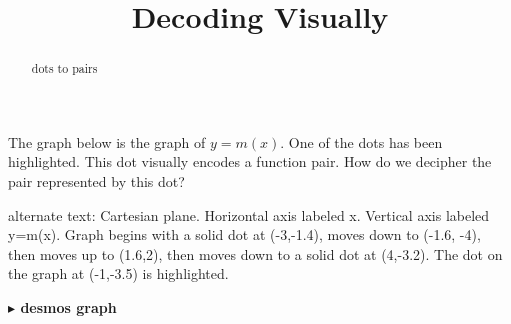 \documentclass{ximera}
\title{Decoding Visually}
\begin{document}
\begin{abstract}
dots to pairs
\end{abstract}
\maketitle










The graph below is the graph of $y = m(x)$.  One of the dots has been highlighted. This dot visually encodes a function pair.  How do we decipher the pair represented by this dot?


\begin{image}
\end{image}




\textcolor{gray!90}{alternate text: Cartesian plane. Horizontal axis labeled x. Vertical axis labeled y=m(x).  Graph begins with a solid dot at (-3,-1.4), moves down to (-1.6, -4), then moves up to (1.6,2), then moves down to a solid dot at (4,-3.2). The dot on the graph at (-1,-3.5) is highlighted.}




\begin{onlineOnly}
\textbf{\textcolor{blue!55!black}{$\blacktriangleright$ desmos graph}} 
\begin{center}
\end{center}
\end{onlineOnly}
\end{document}
